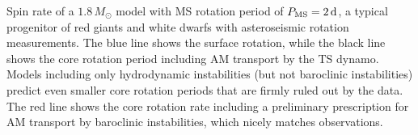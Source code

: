  \label{fig:MRI1p8rot} Spin rate of a $1.8 \, M_\odot$ model with MS rotation period of $P_{\rm MS} = 2 \, {\rm d}$, a typical progenitor of red giants and white dwarfs with asteroseismic rotation measurements. The blue line shows the surface rotation, while the black line shows the core rotation period including AM transport by the TS dynamo. Models including only hydrodynamic instabilities (but not baroclinic instabilities) predict even smaller core rotation periods that are firmly ruled out by the data. The red line shows the core rotation rate including a preliminary prescription for AM transport by baroclinic instabilities, which nicely matches observations.